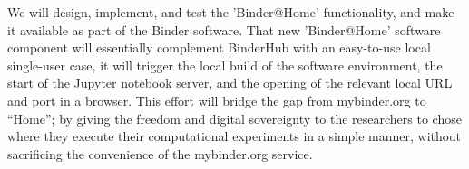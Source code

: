 \begin{task}
We will design, implement, and test the 'Binder@Home' functionality, and make it
available as part of the Binder software. That new 'Binder@Home' software component will
essentially complement BinderHub with an easy-to-use local single-user case, it will trigger
the local build of the software environment, the start of the Jupyter notebook
server, and the opening of the relevant local URL and port in a browser.
This effort will bridge the gap from mybinder.org to ``Home'';
by giving the freedom and digital sovereignty
to the researchers to chose where they execute their computational experiments in a simple manner,
without sacrificing the convenience of the mybinder.org service.

\end{task}
